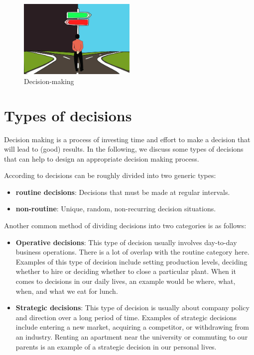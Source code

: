 \documentclass[
  12pt,
  oneside]{book}
\providecommand{\tightlist}{%
  \setlength{\itemsep}{0pt}\setlength{\parskip}{0pt}}
\theoremstyle{definition}
\theoremstyle{definition}
\theoremstyle{definition}
\theoremstyle{definition}
\theoremstyle{remark}
\begin{document}
\begin{figure}
\centering
\includegraphics[width=0.5\textwidth,height=\textheight]{fig/decision-making.jpg}
\caption[\label{fig:decisionm} Decision-making]{\label{fig:decisionm} Decision-making\footnotemark{}}
\end{figure}

\section{Types of decisions}\label{types-of-decisions}

Decision making is a process of investing time and effort to make a decision that will lead to (good) results. In the following, we discuss some types of decisions that can help to design an appropriate decision making process.

According to \citet[p.~9f]{Fitzgerald2002Decision} decisions can be roughly divided into two generic types:

\begin{itemize}
\tightlist
\item
  \textbf{routine decisions}: Decisions that must be made at regular intervals.
\item
  \textbf{non-routine}: Unique, random, non-recurring decision situations.
\end{itemize}

Another common method of dividing decisions into two categories is as follows:

\begin{itemize}
\tightlist
\item
  \textbf{Operative decisions}: This type of decision usually involves day-to-day business operations. There is a lot of overlap with the routine category here. Examples of this type of decision include setting production levels, deciding whether to hire or deciding whether to close a particular plant. When it comes to decisions in our daily lives, an example would be where, what, when, and what we eat for lunch.
\item
  \textbf{Strategic decisions}: This type of decision is usually about company policy and direction over a long period of time. Examples of strategic decisions include entering a new market, acquiring a competitor, or withdrawing from an industry. Renting an apartment near the university or commuting to our parents is an example of a strategic decision in our personal lives.
\end{itemize}
\end{document}
